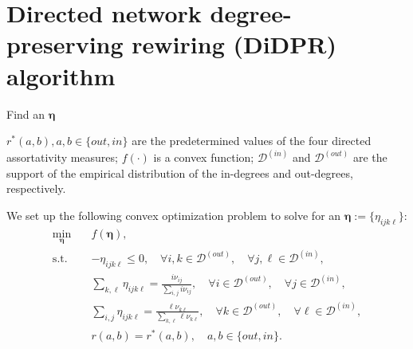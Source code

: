 \documentclass[xcolor=dvipsnames, compress, 10pt]{beamer}
\theoremstyle{remark}
\begin{document}
\section{Directed network degree-preserving rewiring (DiDPR) algorithm}


\begin{frame}{Find an $\bm{\eta}$}

$r^*(a, b), a, b \in \{out, in\}$ are the predetermined values of 
the four directed assortativity measures;
$f(\cdot)$ is a convex function;
$\mathcal{D}^{(in)}$ and $\mathcal{D}^{(out)}$ are the support of
the empirical distribution of the in-degrees and out-degrees, respectively.


We set up the following convex optimization problem to solve for an
$\boldsymbol{\eta} := \{\eta_{ijk\ell}\}$: 
\begin{align*}
  \min_{\bm{\eta}} \quad &f(\bm{\eta}),                            
  \nonumber\\
  \textrm{s.t.}  \quad  &-\eta_{ijk\ell} \le 0,
  \quad \forall i,k \in \mathcal{D}^{(out)}, 
  \quad \forall j,\ell \in \mathcal{D}^{(in)}, 
  \\
  &\sum_{k, \ell} \eta_{ijk\ell} = \frac{i \nu_{ij}}{\sum_{i, j} i \nu_{ij}},
  \quad \forall i \in \mathcal{D}^{(out)}, 
  \quad \forall j \in \mathcal{D}^{(in)},
  \nonumber\\
  & \sum_{i, j} \eta_{ijk\ell} = \frac{\ell \nu_{k\ell}}{\sum_{k, \ell} \ell \nu_{k\ell}},
  \quad \forall k \in \mathcal{D}^{(out)}, 
  \quad \forall \ell \in \mathcal{D}^{(in)},                    
  \nonumber\\
  &r\left(a, b \right) = r^* \left(a, b \right),
  \quad  a, b \in \{out, in\}.
  \nonumber
\end{align*}

\end{frame}


\end{document}
